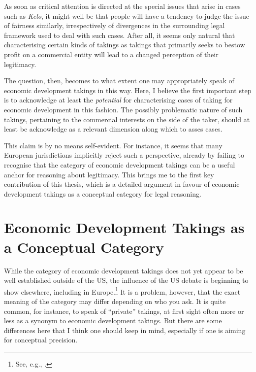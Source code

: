As soon as critical attention is directed at the special issues that arise in cases such as {\it Kelo}, it might well be that people will have a tendency to judge the issue of fairness similarly, irrespectively of divergences in the surrounding legal framework used to deal with such cases. After all, it seems only natural that characterising certain kinds of takings as takings that primarily seeks to bestow profit on a commercial entity will lead to a changed perception of their legitimacy.

The question, then, becomes to what extent one may appropriately speak of economic development takings in this way. Here, I believe the first important step is to acknowledge at least the {\it potential} for characterising cases of taking for economic development in this fashion. The possibly problematic nature of such takings, pertaining to the commercial interests on the side of the taker, should at least be acknowledge as a relevant dimension along which to asses cases.

This claim is by no means self-evident. For instance, it seems that many European jurisdictions implicitly reject such a perspective, already by failing to recognise that the category of economic development takings can be a useful anchor for reasoning about legitimacy. This brings me to the first key contribution of this thesis, which is a detailed argument in favour of economic development takings as a conceptual category for legal reasoning.

\section{Economic Development Takings as a Conceptual Category}

While the category of economic development takings does not yet appear to be well established outside of the US, the influence of the US debate is beginning to show elsewhere, including in Europe.\footnote{See, e.g., \cite{verstappen14}.} It is a problem, however, that the exact meaning of the category may differ depending on who you ask. It is quite common, for instance, to speak of ``private'' takings, at first sight often more or less as a synonym to economic development takings. But there are some differences here that I think one should keep in mind, especially if one is aiming for conceptual precision.

